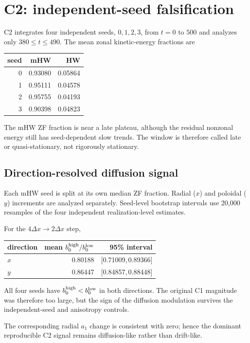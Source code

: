\documentclass[11pt,a4paper]{article}
\begin{document}
\section{C2: independent-seed falsification}
C2 integrates four independent seeds, $0,1,2,3$, from $t=0$ to $500$ and analyzes only $380\le t\le490$. The mean zonal kinetic-energy fractions are
\begin{center}
\begin{tabular}{rrr}
\toprule
seed & mHW & HW\\
\midrule
0 & 0.93080 & 0.05864\\
1 & 0.95111 & 0.04578\\
2 & 0.95755 & 0.04193\\
3 & 0.90398 & 0.04823\\
\bottomrule
\end{tabular}
\end{center}
The mHW ZF fraction is near a late plateau, although the residual nonzonal energy still has seed-dependent slow trends. The window is therefore called late or quasi-stationary, not rigorously stationary.

\subsection{Direction-resolved diffusion signal}
Each mHW seed is split at its own median ZF fraction. Radial ($x$) and poloidal ($y$) increments are analyzed separately. Seed-level bootstrap intervals use 20,000 resamples of the four independent realization-level estimates.

For the $4\Delta x\to2\Delta x$ step,
\begin{center}
\begin{tabular}{lrr}
\toprule
direction & mean $b_0^{\rm high}/b_0^{\rm low}$ & 95\% interval\\
\midrule
$x$ & 0.80188 & [0.71009,\,0.89366]\\
$y$ & 0.86447 & [0.84857,\,0.88448]\\
\bottomrule
\end{tabular}
\end{center}
All four seeds have $b_0^{\rm high}<b_0^{\rm low}$ in both directions. The original C1 magnitude was therefore too large, but the sign of the diffusion modulation survives the independent-seed and anisotropy controls.

The corresponding radial $a_1$ change is consistent with zero; hence the dominant reproducible C2 signal remains diffusion-like rather than drift-like.
\end{document}
